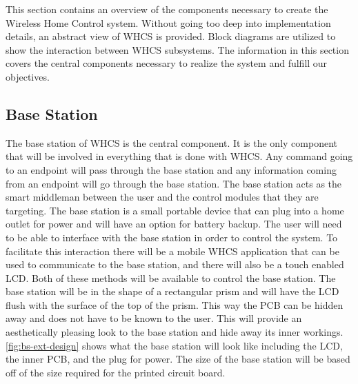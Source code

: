 This section contains an overview of the components necessary to create the
Wireless Home Control system. Without going too deep into implementation
details, an abstract view of WHCS is provided. Block diagrams are utilized to
show the interaction between WHCS subsystems. The information in this section
covers the central components necessary to realize the system and fulfill our
objectives.

\subsection{Base Station}
The base station of WHCS is the central component. It is the only component
that will be involved in everything that is done with WHCS. Any command going
to an endpoint will pass through the base station and any information coming
from an endpoint will go through the base station. The base station acts as the
smart middleman between the user and the control modules that they are
targeting. The base station is a small portable device that can plug into a
home outlet for power and will have an option for battery backup. The user will
need to be able to interface with the base station in order to control the
system. To facilitate this interaction there will be a mobile WHCS application
that can be used to communicate to the base station, and there will also be a
touch enabled LCD. Both of these methods will be available to control the base
station. The base station will be in the shape of a rectangular prism and will
have the LCD flush with the surface of the top of the prism. This way the PCB
can be hidden away and does not have to be known to the user. This will provide
an aesthetically pleasing look to the base station and hide away its inner
workings. \autoref{fig:bs-ext-design} shows what the base station will look like
including the LCD, the inner PCB, and the plug for power. The size of the base
station will be based off of the size required for the printed circuit board.


